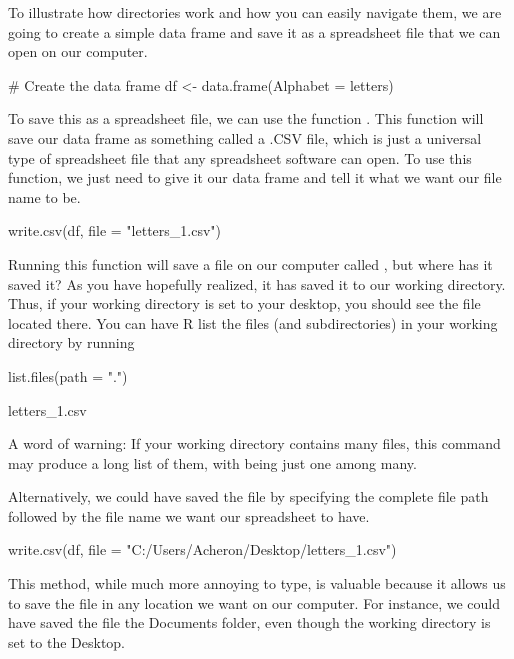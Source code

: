 To illustrate how directories work and how you can easily navigate them, we are going to create a simple data frame and save it as a spreadsheet file that we can open on our computer.

\begin{inR}
# Create the data frame
df <- data.frame(Alphabet = letters)
\end{inR}

\noindent
To save this as a spreadsheet file, we can use the function . This function will save our data frame as something called a .CSV file, which is just a universal type of spreadsheet file that any spreadsheet software can open. To use this function, we just need to give it our data frame and tell it what we want our file name to be.

\begin{inR}
write.csv(df, file = "letters_1.csv")
\end{inR}

\vspace{1em}

Running this function will save a file on our computer called , but where has it saved it? As you have hopefully realized, it has saved it to our working directory. Thus, if your working directory is set to your desktop, you should see the file  located there. You can have R list the files (and subdirectories) in your working directory by running

\begin{inR}
list.files(path = ".")
\end{inR}

\begin{outR}
[1] letters_1.csv
\end{outR}

\noindent A word of warning: If your working directory contains many files, this command may produce a long list of them, with  being just one among many.

Alternatively, we could have saved the file by specifying the complete file path followed by the file name we want our spreadsheet to have.

\begin{inR}
write.csv(df, file = "C:/Users/Acheron/Desktop/letters_1.csv")
\end{inR}

\vspace{1em}

This method, while much more annoying to type, is valuable because it allows us to save the file in any location we want on our computer.  For instance, we could have saved the file the Documents folder, even though the working directory is set to the Desktop.


